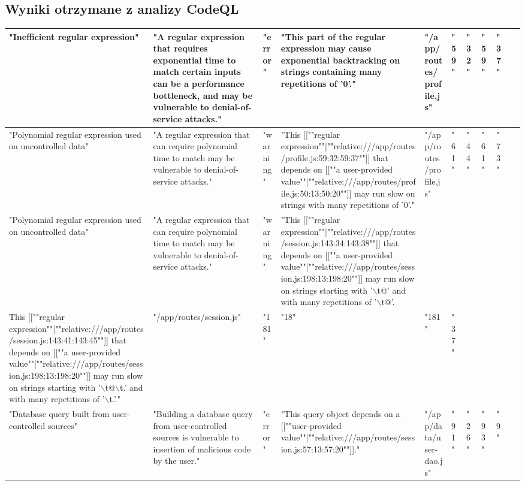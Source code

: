 \subsection{Wyniki otrzymane z analizy CodeQL}
\begin{table}[H]
  \centering
  \footnotesize
  \begin{tabular}{|l|l|l|l|l|l|l|l|l|l|}
  \hline
      "Inefficient regular expression" & "A regular expression that requires exponential time to match certain inputs can be a performance bottleneck, and may be vulnerable to denial-of-service attacks." & "error" & "This part of the regular expression may cause exponential backtracking on strings containing many repetitions of '0'." & "/app/routes/profile.js" & "59" & "32" & "59" & "37" & ~ \\ \hline
      "Polynomial regular expression used on uncontrolled data" & "A regular expression that can require polynomial time to match may be vulnerable to denial-of-service attacks." & "warning" & "This [[""regular expression""|""relative:///app/routes/profile.js:59:32:59:37""]] that depends on [[""a user-provided value""|""relative:///app/routes/profile.js:50:13:50:20""]] may run slow on strings with many repetitions of '0'." & "/app/routes/profile.js" & "61" & "44" & "61" & "73" & ~ \\ \hline
      "Polynomial regular expression used on uncontrolled data" & "A regular expression that can require polynomial time to match may be vulnerable to denial-of-service attacks." & "warning" & "This [[""regular expression""|""relative:///app/routes/session.js:143:34:143:38""]] that depends on [[""a user-provided value""|""relative:///app/routes/session.js:198:13:198:20""]] may run slow on strings starting with '$\backslash$t@' and with many repetitions of '$\backslash$t@'. & ~ & ~ & ~ & ~ & ~ & ~ \\ \hline
      This [[""regular expression""|""relative:///app/routes/session.js:143:41:143:45""]] that depends on [[""a user-provided value""|""relative:///app/routes/session.js:198:13:198:20""]] may run slow on strings starting with '$\backslash$t@$\backslash$t.' and with many repetitions of '$\backslash$t.'." & "/app/routes/session.js" & "181" & "18" & "181" & "37" & ~ & ~ & ~ & ~ \\ \hline
      "Database query built from user-controlled sources" & "Building a database query from user-controlled sources is vulnerable to insertion of malicious code by the user." & "error" & "This query object depends on a [[""user-provided value""|""relative:///app/routes/session.js:57:13:57:20""]]." & "/app/data/user-dao.js" & "91" & "26" & "93" & "9" & ~ \\ \hline

\end{tabular}
\end{table}

